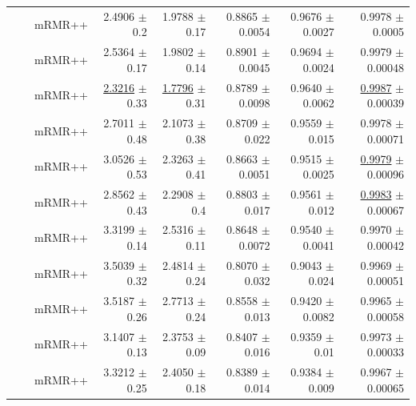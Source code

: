 \begin{longtable}{llp{}rrrrr}
 &  & mRMR++ & 2.4906 {\scriptsize $\pm$ 0.2} & 1.9788 {\scriptsize $\pm$ 0.17} & 0.8865 {\scriptsize $\pm$ 0.0054} & 0.9676 {\scriptsize $\pm$ 0.0027} & 0.9978 {\scriptsize $\pm$ 0.0005} \\
 &  & mRMR++ & 2.5364 {\scriptsize $\pm$ 0.17} & 1.9802 {\scriptsize $\pm$ 0.14} & 0.8901 {\scriptsize $\pm$ 0.0045} & 0.9694 {\scriptsize $\pm$ 0.0024} & 0.9979 {\scriptsize $\pm$ 0.00048} \\
 &  & mRMR++ & \underline{2.3216} {\scriptsize $\pm$ 0.33} & \underline{1.7796} {\scriptsize $\pm$ 0.31} & 0.8789 {\scriptsize $\pm$ 0.0098} & 0.9640 {\scriptsize $\pm$ 0.0062} & \underline{0.9987} {\scriptsize $\pm$ 0.00039} \\
 &  & mRMR++ & 2.7011 {\scriptsize $\pm$ 0.48} & 2.1073 {\scriptsize $\pm$ 0.38} & 0.8709 {\scriptsize $\pm$ 0.022} & 0.9559 {\scriptsize $\pm$ 0.015} & 0.9978 {\scriptsize $\pm$ 0.00071} \\
 &  & mRMR++ & 3.0526 {\scriptsize $\pm$ 0.53} & 2.3263 {\scriptsize $\pm$ 0.41} & 0.8663 {\scriptsize $\pm$ 0.0051} & 0.9515 {\scriptsize $\pm$ 0.0025} & \underline{0.9979} {\scriptsize $\pm$ 0.00096} \\
 &  & mRMR++ & 2.8562 {\scriptsize $\pm$ 0.43} & 2.2908 {\scriptsize $\pm$ 0.4} & 0.8803 {\scriptsize $\pm$ 0.017} & 0.9561 {\scriptsize $\pm$ 0.012} & \underline{0.9983} {\scriptsize $\pm$ 0.00067} \\
 &  & mRMR++ & 3.3199 {\scriptsize $\pm$ 0.14} & 2.5316 {\scriptsize $\pm$ 0.11} & 0.8648 {\scriptsize $\pm$ 0.0072} & 0.9540 {\scriptsize $\pm$ 0.0041} & 0.9970 {\scriptsize $\pm$ 0.00042} \\
 &  & mRMR++ & 3.5039 {\scriptsize $\pm$ 0.32} & 2.4814 {\scriptsize $\pm$ 0.24} & 0.8070 {\scriptsize $\pm$ 0.032} & 0.9043 {\scriptsize $\pm$ 0.024} & 0.9969 {\scriptsize $\pm$ 0.00051} \\
 &  & mRMR++ & 3.5187 {\scriptsize $\pm$ 0.26} & 2.7713 {\scriptsize $\pm$ 0.24} & 0.8558 {\scriptsize $\pm$ 0.013} & 0.9420 {\scriptsize $\pm$ 0.0082} & 0.9965 {\scriptsize $\pm$ 0.00058} \\
 &  & mRMR++ & 3.1407 {\scriptsize $\pm$ 0.13} & 2.3753 {\scriptsize $\pm$ 0.09} & 0.8407 {\scriptsize $\pm$ 0.016} & 0.9359 {\scriptsize $\pm$ 0.01} & 0.9973 {\scriptsize $\pm$ 0.00033} \\
 &  & mRMR++ & 3.3212 {\scriptsize $\pm$ 0.25} & 2.4050 {\scriptsize $\pm$ 0.18} & 0.8389 {\scriptsize $\pm$ 0.014} & 0.9384 {\scriptsize $\pm$ 0.009} & 0.9967 {\scriptsize $\pm$ 0.00065} \\

\end{longtable}
